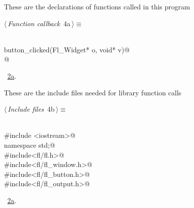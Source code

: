 \documentclass{article}
\renewcommand{\NWtarget}[2]{\hypertarget{#1}{#2}}
\renewcommand{\NWlink}[2]{\hyperlink{#1}{#2}}
\begin{document}
These are the declarations of functions called in this program
\begin{flushleft} \small
\begin{minipage}{\linewidth}\label{scrap6}\raggedright\small
\NWtarget{nuweb4a}{} $\langle\,${\it Function callback}\nobreak\ {\footnotesize {4a}}$\,\rangle\equiv$
\vspace{-1ex}
\begin{list}{}{} \item
\mbox{}\verb@@\\
\mbox{}\verb@void button_clicked(Fl_Widget* o, void* v)@\\
\mbox{}@\\
\mbox{}\verb@@{\NWsep}
\end{list}
\vspace{-1.5ex}
\footnotesize
\begin{list}{}{\setlength{\itemsep}{-\parsep}\setlength{\itemindent}{-\leftmargin}}
\item \NWtxtMacroRefIn\ \NWlink{nuweb2a}{2a}.

\item{}
\end{list}
\end{minipage}\vspace{4ex}
\end{flushleft}
These are the include files needed for library function calls
\begin{flushleft} \small
\begin{minipage}{\linewidth}\label{scrap7}\raggedright\small
\NWtarget{nuweb4b}{} $\langle\,${\it Include files}\nobreak\ {\footnotesize {4b}}$\,\rangle\equiv$
\vspace{-1ex}
\begin{list}{}{} \item
\mbox{}\verb@@\\
\mbox{}\verb@#include <iostream>@\\
\mbox{}\verb@using namespace std;@\\
\mbox{}\verb@#include<fl/fl.h>@\\
\mbox{}\verb@#include<fl/fl_window.h>@\\
\mbox{}\verb@#include<fl/fl_button.h>@\\
\mbox{}\verb@#include<fl/fl_output.h>@\\
\mbox{}\verb@@{\NWsep}
\end{list}
\vspace{-1.5ex}
\footnotesize
\begin{list}{}{\setlength{\itemsep}{-\parsep}\setlength{\itemindent}{-\leftmargin}}
\item \NWtxtMacroRefIn\ \NWlink{nuweb2a}{2a}.

\item{}
\end{list}
\end{minipage}\vspace{4ex}
\end{flushleft}
\end{document}
